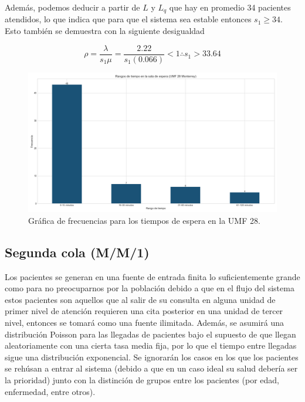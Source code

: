 \documentclass[10pt]{article}
\begin{document}
    Además, podemos deducir a partir de $L$ y $L_{q}$ que hay en promedio 34 pacientes atendidos, lo que indica que para que el sistema sea estable entonces $s_{1} \geq 34$. Esto también se demuestra con la siguiente desigualdad
    
    \begin{equation*}
    	\rho = \frac{\lambda}{s_{1}\mu} = \frac{2.22}{s_{1}(0.066)} < 1
    	\therefore s_{1} > 33.64
    \end{equation*}
    
    \begin{figure}[h]
    	\centering
    	\includegraphics[width=\linewidth]{./images/rangos-tiempo-espera-umf28.png}
    	\caption{Gráfica de frecuencias para los tiempos de espera en la UMF 28.}
    	\label{fig:frec_espera_umf28}
    \end{figure}
    
    \subsection{Segunda cola (M/M/1)}
    Los pacientes se generan en una fuente de entrada finita lo suficientemente grande como para no preocuparnos por la población debido a que en el flujo del sistema estos pacientes son aquellos que al salir de su consulta en alguna unidad de primer nivel de atención requieren una cita posterior en una unidad de tercer nivel, entonces se tomará como una fuente ilimitada. Además, se asumirá una distribución Poisson para las llegadas de pacientes bajo el supuesto de que llegan aleatoriamente con una cierta tasa media fija, por lo que el tiempo entre llegadas sigue una distribución exponencial. Se ignorarán los casos en los que los pacientes se rehúsan a entrar al sistema (debido a que en un caso ideal su salud debería ser la prioridad) junto con la distinción de grupos entre los pacientes (por edad, enfermedad, entre otros).
    
\end{document}
